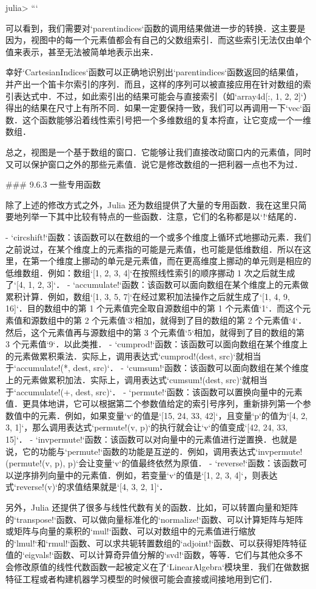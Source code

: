 julia> 
```

可以看到，我们需要对`parentindices`函数的调用结果做进一步的转换．这主要是因为，视图中的每一个元素值都会有自己的父数组索引．而这些索引无法仅由单个值来表示，甚至无法被简单地表示出来．

幸好`CartesianIndices`函数可以正确地识别出`parentindices`函数返回的结果值，并产出一个笛卡尔索引的序列．而且，这样的序列可以被直接应用在针对数组的索引表达式中．不过，如此索引出的结果可能会与直接索引（如`array4d[:, 1, 2, 2]`）得出的结果在尺寸上有所不同．如果一定要保持一致，我们可以再调用一下`vec`函数．这个函数能够沿着线性索引号把一个多维数组的复本捋直，让它变成一个一维数组．

总之，视图是一个基于数组的窗口．它能够让我们直接改动窗口内的元素值，同时又可以保护窗口之外的那些元素值．说它是修改数组的一把利器一点也不为过．

### 9.6.3 一些专用函数

除了上述的修改方式之外，Julia 还为数组提供了大量的专用函数．我在这里只简要地列举一下其中比较有特点的一些函数．注意，它们的名称都是以`!`结尾的．

- `circshift!`函数：该函数可以在数组的一个或多个维度上循环式地挪动元素．我们之前说过，在某个维度上的元素指的可能是元素值，也可能是低维数组．所以在这里，在第一个维度上挪动的单元是元素值，而在更高维度上挪动的单元则是相应的低维数组．例如：数组`[1, 2, 3, 4]`在按照线性索引的顺序挪动 1 次之后就生成了`[4, 1, 2, 3]`．
- `accumulate!`函数：该函数可以面向数组在某个维度上的元素做累积计算．例如，数组`[1, 3, 5, 7]`在经过累积加法操作之后就生成了`[1, 4, 9, 16]`．目的数组中的第 1 个元素值完全取自源数组中的第 1 个元素值`1`．而这个元素值和源数组中的第 2 个元素值`3`相加，就得到了目的数组的第 2 个元素值`4`．然后，这个元素值再与源数组中的第 3 个元素值`5`相加，就得到了目的数组的第 3 个元素值`9`．以此类推．
- `cumprod!`函数：该函数可以面向数组在某个维度上的元素做累积乘法．实际上，调用表达式`cumprod!(dest, src)`就相当于`accumulate!(*, dest, src)`．
- `cumsum!`函数：该函数可以面向数组在某个维度上的元素做累积加法．实际上，调用表达式`cumsum!(dest, src)`就相当于`accumulate!(+, dest, src)`．
- `permute!`函数：该函数可以置换向量中的元素值．更具体地讲，它可以根据第二个参数值给定的索引号序列，重新排列第一个参数值中的元素．例如，如果变量`v`的值是`[15, 24, 33, 42]`，且变量`p`的值为`[4, 2, 3, 1]`，那么调用表达式`permute!(v, p)`的执行就会让`v`的值变成`[42, 24, 33, 15]`．
- `invpermute!`函数：该函数可以对向量中的元素值进行逆置换．也就是说，它的功能与`permute!`函数的功能是互逆的．例如，调用表达式`invpermute!(permute!(v, p), p)`会让变量`v`的值最终依然为原值．
- `reverse!`函数：该函数可以逆序排列向量中的元素值．例如，若变量`v`的值是`[1, 2, 3, 4]`，则表达式`reverse!(v)`的求值结果就是`[4, 3, 2, 1]`．

另外，Julia 还提供了很多与线性代数有关的函数．比如，可以转置向量和矩阵的`transpose!`函数、可以做向量标准化的`normalize!`函数、可以计算矩阵与矩阵或矩阵与向量的乘积的`mul!`函数、可以对数组中的元素值进行缩放的`lmul!`和`rmul!`函数、可以求共轭转置数组的`adjoint!`函数、可以获得矩阵特征值的`eigvals!`函数、可以计算奇异值分解的`svd!`函数，等等．它们与其他众多不会修改原值的线性代数函数一起被定义在了`LinearAlgebra`模块里．我们在做数据特征工程或者构建机器学习模型的时候很可能会直接或间接地用到它们．
